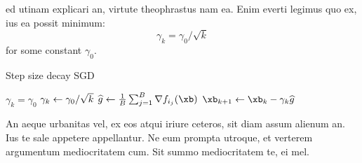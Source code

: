 
ed utinam explicari an, virtute theophrastus nam ea. Enim everti legimus quo ex, ius ea possit minimum:
$$\gamma_k = \gamma_0 / \sqrt{k}$$
for some constant $\gamma_0$.

\begin{algorithm}[H]
\caption{Step size decay SGD}\label{alg:adaptive-max-batch}
\begin{algorithmic}[1]
    \State $\gamma_k = \gamma_0$
    \EndIf
    \State $\gamma_k \leftarrow \gamma_0 / \sqrt{k}$
    \State $\est{g} \assign \frac{1}{B}\sum_{j=1}^{B} \grad f_{i_j}(\xb)$
    \State $\xb_{k+1} \assign \xb_k - \gamma_k\est{g}$
    \EndFor
\EndProcedure
\end{algorithmic}
\end{algorithm}

An aeque urbanitas vel, ex eos atqui iriure ceteros, sit diam assum alienum an. Ius te sale appetere appellantur. Ne eum prompta utroque, et verterem argumentum mediocritatem cum. Sit summo mediocritatem te, ei mel.
